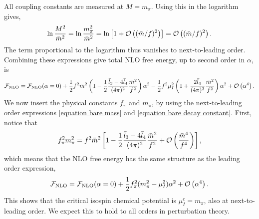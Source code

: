 All coupling constants are measured at $M = m_\pi$.
Using this in the logarithm gives,
\begin{equation}
    \ln \frac{M^2}{\bar m^2}
    = \ln \frac{m_\pi^2}{\bar m^2}
    = \ln \left[1 + \Oh[2]{(\bar m/f)} \right]
    = \Oh[2]{(\bar m/f)}.
\end{equation}
The term proportional to the logarithm thus vanishes to next-to-leading order.
Combining these expressions give total NLO free energy, up to second order in $\alpha$, is
\begin{equation}
    \Ef_{\mathrm{NLO}}
    =
    \Ef_{\mathrm{NLO}}(\alpha = 0)
    +
    \frac{1}{2} f^2 \bar m^2
    \left(
        1
        -
        \frac{1}{2}
        \frac{\bar l_3 - 4 \bar l_4}{(4 \pi)^2} \frac{\bar m^2}{f^2}
    \right)\alpha^2
    - \frac{1}{2}f^2 \mu_I^2
    \left(
        1
        +
        \frac{2 \bar l_4}{(4 \pi)^2}
        \frac{\bar m^2}{f^2}
    \right) \alpha^2
    + \Oh[4]{\alpha}.
\end{equation}
We now insert the physical constants $f_\pi$ and $m_\pi$, by using the next-to-leading order expressions \cref{equation bare mass} and \cref{equation bare decay constant}.
First, notice that
\begin{equation}
    f_\pi^2 m_\pi^2
    = f^2 \bar m^2
    \left[
        1 - \frac{1}{2} \frac{\bar l_3 - 4 \bar l_4}{(4 \pi)^2} \frac{\bar m^2}{f^2}
        +
        \Oh[]{\frac{\bar m^4}{f^4}}
    \right],
\end{equation}
which means that the NLO free energy has the same structure as the leading order expression,
\begin{equation}
    \Ef_{\mathrm{NLO}}
    =
    \Ef_{\mathrm{NLO}}(\alpha = 0)
    + \frac{1}{2}f_\pi^2 (m_\pi^2 - \mu_I^2 )\alpha^2
    + \Oh[4]{\alpha}.
\end{equation}
This shows that the critical isospin chemical potential is $\mu_I^c = m_\pi$, also at next-to-leading order.
We expect this to hold to all orders in perturbation theory.
